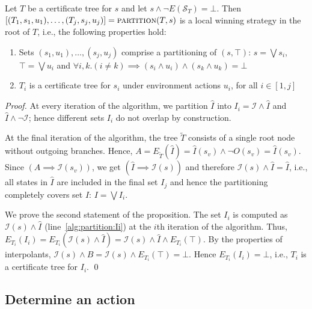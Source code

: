 \begin{proposition}\label{prop:partition}
    Let $T$ be a certificate tree for $s$ and let $s \land \lnot E(\mathcal{S}_T) = \bot$. Then $[(T_1, s_1, u_1),\ldots,(T_j, s_j, u_j)] = \textsc{partition}(T, s)$ is a local winning strategy in the root of $T$, i.e., the following properties hold:
    \begin{enumerate}
        \item Sets $(s_1,u_1) ,\ldots, (s_j,u_j)$ comprise a partitioning of
            $(s, \top)$: $s = \bigvee s_i$, $\top = \bigvee u_i$ and $\forall i, k. (i\neq k) \implies (s_i \land u_i) \land (s_k \land u_k) = \bot$
        \item $T_i$ is a certificate tree for $s_i$ under environment actions $u_i$, for all $i\in[1,j]$
    \end{enumerate}
\end{proposition}
\begin{proof}
    At every iteration of the algorithm, we partition $\hat{I}$
    into $I_i = \mathcal{I} \land\hat{I}$ and
    $\hat{I} \land \neg\mathcal{I}$; hence different sets $I_i$ do
    not overlap by construction.

    At the final iteration of the algorithm, the tree $\tilde{T}$
    consists of a single root node without outgoing branches.
    Hence, $A = E_{\tilde{T}}(\hat{I}) = \hat{I}(s_v) \land \neg O(s_v) =
    \hat{I}(s_v)$.  Since $(A\implies \mathcal{I}(s_v))$, we get $(\hat{I} \implies \mathcal{I}(s))$
    and therefore $\mathcal{I}(s) \land \hat{I} = \hat{I}$, i.e., all
    states in $\hat{I}$ are included in the final set $I_j$ and hence
    the partitioning completely covers set $I$: $I=\bigvee I_i$.

    We prove the second statement of the proposition.  The set $I_i$ is computed as
    $\mathcal{I}(s) \land \hat{I}$ (line~\ref{alg:partition:Ii}) at the $i$th iteration of the algorithm.
    Thus, $E_{T_i}(I_i) = E_{T_i}(\mathcal{I}(s) \land \hat{I}) = \mathcal{I}(s) \land \hat{I} \land E_{T_i}(\top)$.
    By the properties of interpolants, $\mathcal{I}(s) \land B = \mathcal{I}(s) \land E_{T_i}(\top) = \bot$.
    Hence $E_{T_i}(I_i) = \bot$, i.e., $T_i$ is a certificate tree for $I_i$.
    \qed
\end{proof}

\subsection{Determine an action}

